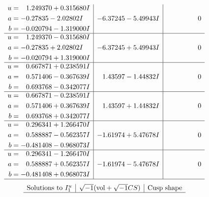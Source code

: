 \documentclass[1p]{elsarticle_modified}
\theoremstyle{definition}
\newcommand{\I}{\sqrt{-1}}
\begin{document}
$$\begin{array}{c|c|c}
\begin{aligned}
u &= \phantom{-}1.249370 + 0.315680 I \\
a &= -0.27835 - 2.02802 I \\
b &= -0.020794 - 1.319000 I\end{aligned}
 & -6.37245 - 5.49943 I & \phantom{-0.000000 } 0 \\ \hline\begin{aligned}
u &= \phantom{-}1.249370 - 0.315680 I \\
a &= -0.27835 + 2.02802 I \\
b &= -0.020794 + 1.319000 I\end{aligned}
 & -6.37245 + 5.49943 I & \phantom{-0.000000 } 0 \\ \hline\begin{aligned}
u &= \phantom{-}0.667871 + 0.238591 I \\
a &= \phantom{-}0.571406 - 0.367639 I \\
b &= \phantom{-}0.693768 - 0.342077 I\end{aligned}
 & \phantom{-}1.43597 - 1.44832 I & \phantom{-0.000000 } 0 \\ \hline\begin{aligned}
u &= \phantom{-}0.667871 - 0.238591 I \\
a &= \phantom{-}0.571406 + 0.367639 I \\
b &= \phantom{-}0.693768 + 0.342077 I\end{aligned}
 & \phantom{-}1.43597 + 1.44832 I & \phantom{-0.000000 } 0 \\ \hline\begin{aligned}
u &= \phantom{-}0.296341 + 1.266470 I \\
a &= \phantom{-}0.588887 - 0.562357 I \\
b &= -0.481408 - 0.968073 I\end{aligned}
 & -1.61974 + 5.47678 I & \phantom{-0.000000 } 0 \\ \hline\begin{aligned}
u &= \phantom{-}0.296341 - 1.266470 I \\
a &= \phantom{-}0.588887 + 0.562357 I \\
b &= -0.481408 + 0.968073 I\end{aligned}
 & -1.61974 - 5.47678 I & \phantom{-0.000000 } 0\\
 \hline 
 \end{array}$$\newpage$$\begin{array}{c|c|c}  
\text{Solutions to }I^u_{1}& \I (\text{vol} + \sqrt{-1}CS) & \text{Cusp shape}\\
 \hline 

\end{array}$$
\end{document}
